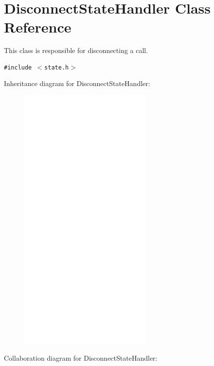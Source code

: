 \hypertarget{classDisconnectStateHandler}{
\section{DisconnectStateHandler Class Reference}
\label{classDisconnectStateHandler}
}
This class is responsible for disconnecting a call.  


{\tt \#include $<$state.h$>$}

Inheritance diagram for DisconnectStateHandler:\nopagebreak
\begin{figure}[H]
\begin{center}
\leavevmode
\includegraphics[width=190pt]{classDisconnectStateHandler__inherit__graph}
\end{center}
\end{figure}
Collaboration diagram for DisconnectStateHandler:\nopagebreak
